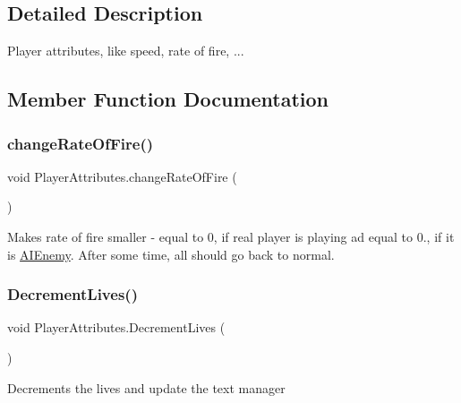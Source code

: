 \subsection{Detailed Description}
Player attributes, like speed, rate of fire, ... 



\subsection{Member Function Documentation}
\mbox{\label{class_player_attributes_a536939a7d2aedf70cfc7a2359ac1784f}} 
\subsubsection{\texorpdfstring{change\+Rate\+Of\+Fire()}{changeRateOfFire()}}
{\footnotesize\ttfamily void Player\+Attributes.\+change\+Rate\+Of\+Fire (\begin{DoxyParamCaption}{ }\end{DoxyParamCaption})\hspace{0.3cm}{\ttfamily [private]}}



Makes rate of fire smaller -\/ equal to 0, if real player is playing ad equal to 0., if it is \mbox{\hyperlink{class_a_i_enemy}{A\+I\+Enemy}}. After some time, all should go back to normal. 

\mbox{\label{class_player_attributes_ae04bfec3ffddefb521aca753c9b832ea}} 
\subsubsection{\texorpdfstring{Decrement\+Lives()}{DecrementLives()}}
{\footnotesize\ttfamily void Player\+Attributes.\+Decrement\+Lives (\begin{DoxyParamCaption}{ }\end{DoxyParamCaption})}



Decrements the lives and update the text manager 

